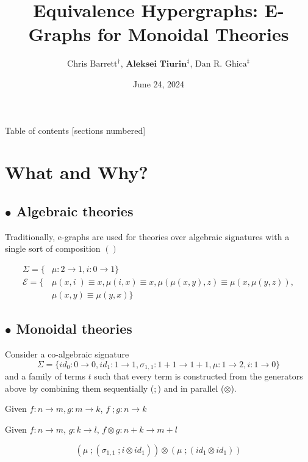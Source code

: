 \documentclass[aspectratio=169]{beamer}
\title{Equivalence Hypergraphs: E-Graphs for Monoidal Theories}
\date{June 24, 2024} %
\author[Aleksei Tiurin]{$\text{Chris Barrett}^{\dagger}$, $\textbf{Aleksei Tiurin}^{\ddagger}$, $\text{Dan R. Ghica}^{\ddagger}$}
\institute{$^{\dagger}$University of Oxford, $^{\ddagger}$University of Birmingham}
\newcommand{\bsubsection}[1]{\subsection{$\bullet$ #1}}
\begin{document}
 

\maketitle 

\begin{frame}{Table of contents}
    \small
    [sections numbered]
    \tableofcontents
\end{frame}

\section{What and Why?}
\bsubsection{Algebraic theories}

\begin{frame}
    Traditionally, e-graphs are used for \alert{theories} over \alert{algebraic} signatures with a single sort of composition $()$
    \pause
    \vfill
    \begin{example}
    
    \begin{align*}
    \Sigma = \{&\mu : 2 \to 1, i : 0 \to 1\}\\
    \mathcal{E} = \{&\mu(x,i\;) \equiv x, \mu(i,x) \equiv x,
     \mu(\mu(x,y),z) \equiv \mu(x,\mu(y,z)),\\
    &\mu(x,y) \equiv \mu(y,x)\}    
    \end{align*}
    \end{example}

\end{frame}

\bsubsection{Monoidal theories}

\begin{frame}{}
    
Consider a \alert{co-algebraic} signature 
\[
\Sigma = \{id_0 : 0 \to 0, id_{1} : 1 \to 1, \sigma_{1,1} : 1 + 1 \to 1 + 1,\mu : 1 \to 2, i : 1 \to 0\}
\]
and a family of terms $t$ such that every term is constructed from the generators above by combining them sequentially ($;$) and in parallel ($\otimes$).

Given $f : n \to m, g : m \to k$, $f\;;g : n \to k$

Given $f : n \to m$, $g : k \to l$, $f \otimes g : n + k \to m + l$

\pause
\begin{example}
    \[
    (\mu\;;(\sigma_{1,1}\;;i \otimes id_{1})) \otimes (\mu\;;(id_{1}\otimes id_{1}))
    \]
\end{example}

\end{frame}
\end{document}
